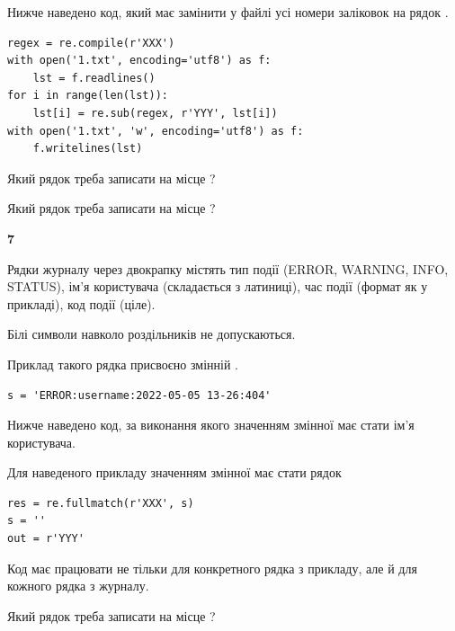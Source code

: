 Нижче наведено код, який має замінити у файлі усі номери заліковок на рядок \code{***}.



\begin{verbatim}
regex = re.compile(r'XXX')
with open('1.txt', encoding='utf8') as f:
    lst = f.readlines()
for i in range(len(lst)):
    lst[i] = re.sub(regex, r'YYY', lst[i])
with open('1.txt', 'w', encoding='utf8') as f:
    f.writelines(lst)
\end{verbatim}







Який рядок треба записати на місце  ?\par
\vspace{5mm}


Який рядок треба записати на місце  ?\par


\newpage

{\begin {center}\textbf{ 7}\end {center}}\par
Рядки журналу через двокрапку містять тип події (ERROR, WARNING, INFO, STATUS), ім'я користувача (складається з латиниці), час події (фор\-мат як у прикладі), код події (ціле).

Білі символи навколо роздільників не допускаються.

Приклад такого рядка присвоєно змінній .



\begin{verbatim}
s = 'ERROR:username:2022-05-05 13-26:404'
\end{verbatim}


Нижче наведено код, за виконання якого значенням змінної  має стати ім'я користувача.

Для наведеного прикладу значенням змінної  має стати рядок 



\begin{verbatim}
res = re.fullmatch(r'XXX', s)
s = ''
out = r'YYY'
\end{verbatim}


Код має працювати не тільки для конкретного рядка з прикладу, але й для кожного рядка з журналу.




Який рядок треба записати на місце  ?\par
\vspace{5mm}


